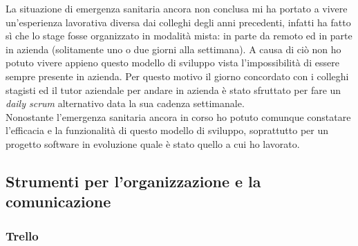 La situazione di emergenza sanitaria ancora non conclusa mi ha portato a vivere un'esperienza lavorativa diversa dai colleghi degli anni precedenti, infatti ha fatto sì che lo stage fosse organizzato in modalità mista: in parte da remoto ed in parte in azienda (solitamente uno o due giorni alla settimana). A causa di ciò non ho potuto vivere appieno questo modello di sviluppo vista l'impossibilità di essere sempre presente in azienda. Per questo motivo il giorno concordato con i colleghi stagisti ed il tutor aziendale per andare in azienda è stato sfruttato per fare un \textit{daily scrum} alternativo data la sua cadenza settimanale.\\ 
Nonostante l'emergenza sanitaria ancora in corso ho potuto comunque constatare l’efficacia e la funzionalità di questo modello di sviluppo, soprattutto per un progetto software in evoluzione quale è stato quello a cui ho lavorato.\\

\subsection{Strumenti per l'organizzazione e la comunicazione}
\label{subsec:strumenti-organizzazione-comunicazione}

\subsubsection{Trello}
\label{subsubsec:trello}

